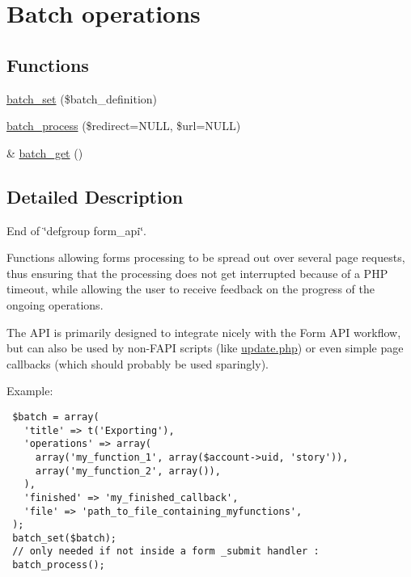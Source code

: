 \hypertarget{group__batch}{
\section{Batch operations}
\label{group__batch}
}
\subsection*{Functions}
\begin{CompactItemize}
\item 
\hyperlink{group__batch_g9ff3f18b3bdd1d62ab7ac681a22a7170}{batch\_\-set} (\$batch\_\-definition)
\item 
\hyperlink{group__batch_g35560f242c9a5da0d136e652d4d1da47}{batch\_\-process} (\$redirect=NULL, \$url=NULL)
\item 
\& \hyperlink{group__batch_g971f5246c6e8e536d0b20529fb2e2638}{batch\_\-get} ()
\end{CompactItemize}


\subsection{Detailed Description}
End of \char`\"{}defgroup form\_\-api\char`\"{}.

Functions allowing forms processing to be spread out over several page requests, thus ensuring that the processing does not get interrupted because of a PHP timeout, while allowing the user to receive feedback on the progress of the ongoing operations.

The API is primarily designed to integrate nicely with the Form API workflow, but can also be used by non-FAPI scripts (like \hyperlink{update_8php}{update.php}) or even simple page callbacks (which should probably be used sparingly).

Example: 

\begin{Code}\begin{verbatim} $batch = array(
   'title' => t('Exporting'),
   'operations' => array(
     array('my_function_1', array($account->uid, 'story')),
     array('my_function_2', array()),
   ),
   'finished' => 'my_finished_callback',
   'file' => 'path_to_file_containing_myfunctions',
 );
 batch_set($batch);
 // only needed if not inside a form _submit handler :
 batch_process();
\end{verbatim}
\end{Code}



